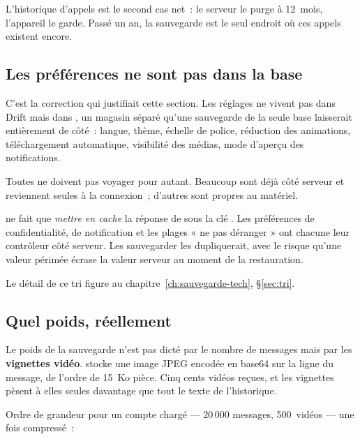 \documentclass[11pt,a4paper,oneside]{report}
\begin{document}
L'historique d'appels est le second cas net~: le serveur le purge à 12~mois, l'appareil le
garde. Passé un an, la sauvegarde est le seul endroit où ces appels existent encore.

\subsection*{Les préférences ne sont pas dans la base}

C'est la correction qui justifiait cette section. Les réglages ne vivent pas dans Drift mais
dans , un magasin séparé qu'une sauvegarde de la seule base
laisserait entièrement de côté~: langue, thème, échelle de police, réduction des animations,
téléchargement automatique, visibilité des médias, mode d'aperçu des notifications.

Toutes ne doivent pas voyager pour autant. Beaucoup sont déjà côté serveur et reviennent
seules à la connexion~; d'autres sont propres au matériel.

\begin{constat}
 ne fait que \emph{mettre en cache} la réponse de
 sous la clé . Les préférences de
confidentialité, de notification et les plages « ne pas déranger » ont chacune leur
contrôleur côté serveur. Les sauvegarder les dupliquerait, avec le risque qu'une valeur
périmée écrase la valeur serveur au moment de la restauration.
\end{constat}

Le détail de ce tri figure au chapitre~\ref{ch:sauvegarde-tech}, §\ref{sec:tri}.

\subsection*{Quel poids, réellement}

\begin{alerte}
Le poids de la sauvegarde n'est pas dicté par le nombre de messages mais par les
\textbf{vignettes vidéo}.  stocke une image JPEG encodée en base64 sur la
ligne du message, de l'ordre de 15~Ko pièce. Cinq cents vidéos reçues, et les vignettes
pèsent à elles seules davantage que tout le texte de l'historique.
\end{alerte}

Ordre de grandeur pour un compte chargé --- 20\,000 messages, 500~vidéos --- une fois
compressé~:
\end{document}
